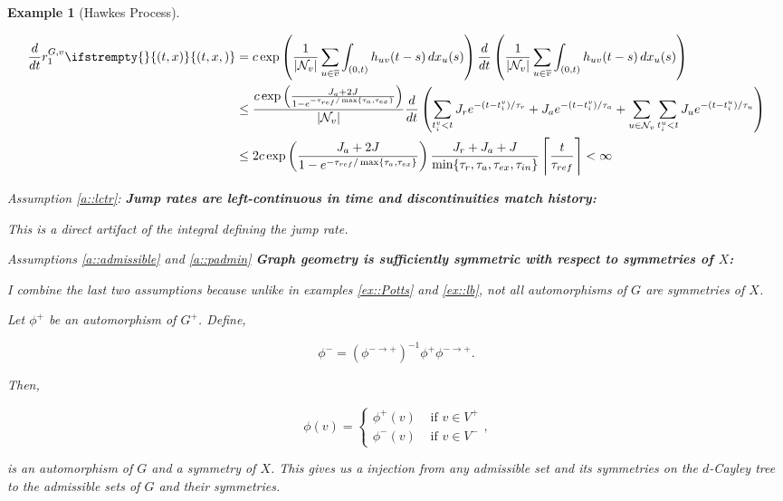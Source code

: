 \documentclass[12pt]{article}
\newcommand{\mc}{\mathcal}
\newcommand{\ra}{\rightarrow}
\newcommand{\ov}{\overline}
\newcommand{\te}{\text}
\newcommand{\ind}{\hspace{24pt}}
\newcommand{\neigh}[1]{\mc{N}_{#1}}				%
\newcommand{\cl}[1]{\ov{#1}}						%
\newcommand{\Xf}{X}									%
\newcommand{\rate}{r}								%
\newcommand{\xf}{x}									%
\newcommand{\vind}[1]{_{#1}}						%
\newcommand{\stpara}[1]{_{#1}}						%
\newcommand{\gvpara}[2]{^{#1,#2}}					%
\newcommand{\tmepro}[3]{
\ifstrempty{#3}{
	\left(#1,#2\right)}{
	\left(#1,#2,#3\right)}}							%
\renewcommand{\d}{d}								%
\newtheorem{example}[thms]{Example}
\begin{document}
\begin{example}[Hawkes Process]
\begin{description}
\begin{align*}
\frac{d}{dt}\rate\stpara{1}\gvpara{G}{v}\tmepro{t}{\xf}{} &= c\exp\left(\frac{1}{|\neigh{v}|}\sum_{u\in\cl{v}}\int_{(0,t)} h_{uv}(t-s)\,d\xf\vind{u}(s)\right)\frac{d}{dt}\left(\frac{1}{|\neigh{v}|}\sum_{u\in\cl{v}}\int_{(0,t)} h_{uv}(t-s)\,d\xf\vind{u}(s)\right)\\
&\leq \frac{c\exp\left(\frac{J_a + 2J}{1 - e^{-\tau_{ref}/\max\{\tau_a,\tau_{ex}\}}}\right)}{|\neigh{v}|}\frac{d}{dt}\left(\sum_{t^v_i < t} J_re^{-(t-t^v_i)/\tau_r} + J_ae^{-(t-t^v_i)/\tau_a} + \sum_{u\in\neigh{v}}\sum_{t^u_i < t} J_ue^{-(t-t^u_i)/\tau_u}\right)\\
&\leq 2c\exp\left(\frac{J_a + 2J}{1 - e^{-\tau_{ref}/\max\{\tau_a,\tau_{ex}\}}}\right)\frac{J_r + J_a + J}{\min\{\tau_r,\tau_a,\tau_{ex},\tau_{in}\}}\left\lceil\frac{t}{\tau_{ref}}\right\rceil < \infty
\end{align*}

\item[] Assumption \ref{a::lctr}: \textbf{Jump rates are left-continuous in time and discontinuities match history:}

This is a direct artifact of the integral defining the jump rate.

\item[] Assumptions \ref{a::admissible} and \ref{a::padmin} \textbf{Graph geometry is sufficiently symmetric with respect to symmetries of \(\Xf\):}

I combine the last two assumptions because unlike in examples \ref{ex::Potts} and \ref{ex::lb}, not all automorphisms of \(G\) are symmetries of \(\Xf\).

\ind Let \(\phi^+\) be an automorphism of \(G^+\). Define,

\[\phi^- = (\phi^{-\ra+})^{-1}\phi^+\phi^{-\ra+}.\]

Then,

\[\phi(v) = \begin{cases}
\phi^+(v) &\te{ if } v \in V^+\\
\phi^-(v) &\te{ if } v \in V^-
\end{cases},\]

is an automorphism of \(G\) and a symmetry of \(\Xf\). This gives us a injection from any admissible set and its symmetries on the \(\d\)-Cayley tree to the admissible sets of \(G\) and their symmetries.
\end{description}

\end{example}
\end{document}
